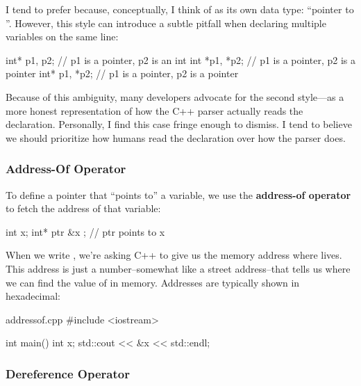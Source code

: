 \documentclass[12pt]{article}
\begin{document}
\begin{advice}
\noindent
I tend to prefer  because, conceptually, I think of  as its own data type: ``pointer to ''.
However, this style can introduce a subtle pitfall when declaring multiple variables on the same line:

\begin{cxx}{}
int* p1, p2;  // p1 is a pointer, p2 is an int
int *p1, *p2; // p1 is a pointer, p2 is a pointer
int* p1, *p2; // p1 is a pointer, p2 is a pointer
\end{cxx}

\noindent
Because of this ambiguity, many developers advocate for the second style----as a more honest representation of how the C++ parser actually reads the declaration.
Personally, I find this case fringe enough to dismiss.
I tend to believe we should prioritize how humans read the declaration over how the parser does.

\end{advice}

\subsubsection{Address-Of Operator \inlinecxx{&}}

\noindent
To define a pointer that ``points to'' a variable, we use the \textbf{address-of operator} \inlinecxx{&} to fetch the address of that variable:

\begin{cxx}{}
int x;
int* ptr { &x }; // ptr points to x
\end{cxx}

\noindent
When we write , we're asking C++ to give us the memory address where  lives.
This address is just a number--somewhat like a street address--that tells us where we can find the value of  in memory.
Addresses are typically shown in hexadecimal:

\begin{cxx}{addressof.cpp}
#include <iostream>

int main()
{
	int x;
	std::cout << &x << std::endl;
}
\end{cxx}


\subsubsection{Dereference Operator \inlinecxx{*}}
\end{document}
